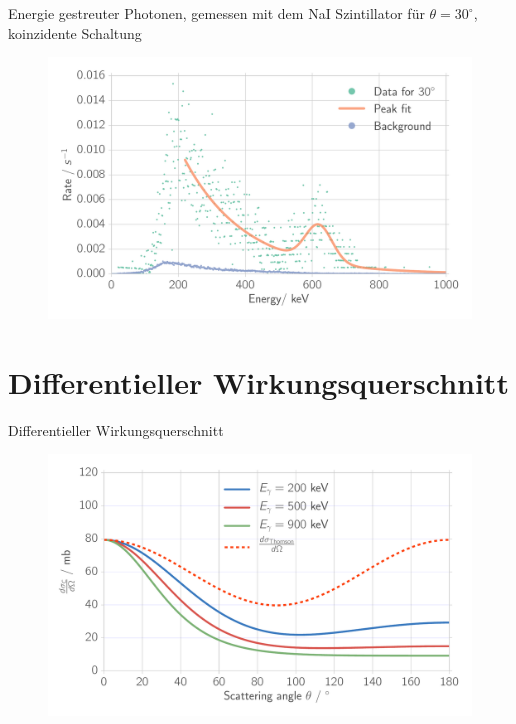 \documentclass[xcolor=x11names,compress]{beamer}
\renewcommand{\(}{\begin{columns}}
\renewcommand{\)}{\end{columns}}
\newcommand{\<}[1]{\begin{column}{#1}}
\renewcommand{\>}{\end{column}}
\begin{document}
\begin{frame}[t]{Energie gestreuter Photonen, gemessen mit dem NaI Szintillator für 
    $\theta = 30^\circ$, koinzidente Schaltung}
\begin{figure}[htpb]
    \centering
    \includegraphics[width=1.0\linewidth]{../analysis/figures/coin_na_30}
    \label{fig:coin_na_30}
\end{figure}
\end{frame}


\section{Differentieller Wirkungsquerschnitt}
\begin{frame}[t]{Differentieller Wirkungsquerschnitt}
\begin{figure}[htpb]
    \centering
    \includegraphics[width=1.0\linewidth]{../analysis/figures/theory_diff_cs}
\label{fig:theory_diff}
\end{figure}
\end{frame}
\end{document}
